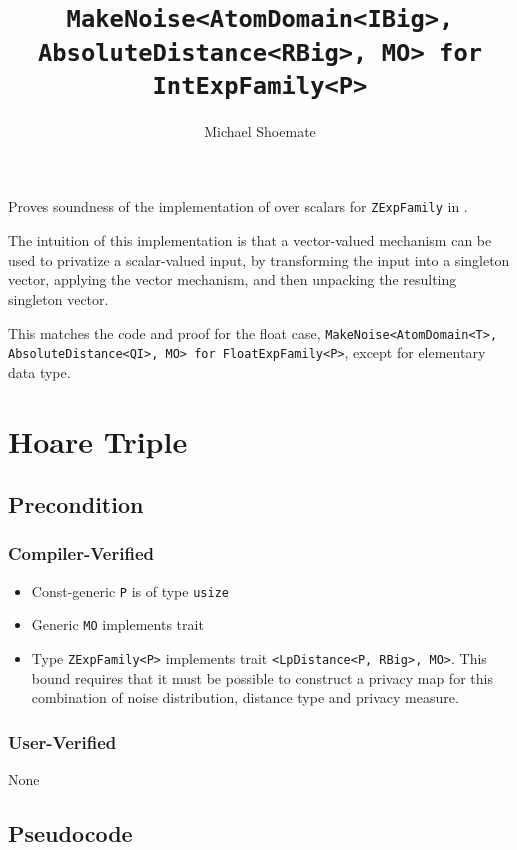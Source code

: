 \documentclass{article}
\title{\texttt{MakeNoise<AtomDomain<IBig>, AbsoluteDistance<RBig>, MO> for IntExpFamily<P>}}
\author{Michael Shoemate}
\date{}
\begin{document}
\maketitle

\contrib
Proves soundness of the implementation of  over scalars
for \texttt{ZExpFamily} in .

The intuition of this implementation is that a vector-valued mechanism can be used to privatize a scalar-valued input,
by transforming the input into a singleton vector, 
applying the vector mechanism, and then unpacking the resulting singleton vector.

This matches the code and proof for the float case, \texttt{MakeNoise<AtomDomain<T>, AbsoluteDistance<QI>, MO> for FloatExpFamily<P>},
except for elementary data type.

\section{Hoare Triple}
\subsection*{Precondition}
\subsubsection*{Compiler-Verified}

\begin{itemize}
    \item Const-generic \texttt{P} is of type \texttt{usize}
    \item Generic \texttt{MO} implements trait 
    \item Type \texttt{ZExpFamily<P>} implements trait \texttt{<LpDistance<P, RBig>, MO>}.
        This bound requires that it must be possible to construct a privacy map for this combination of noise distribution, distance type and privacy measure.
\end{itemize}

\subsubsection*{User-Verified}
None

\subsection*{Pseudocode}

\end{document}
